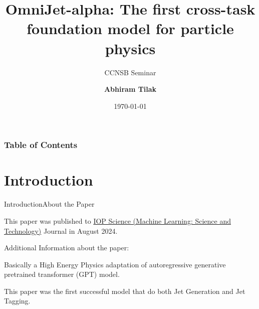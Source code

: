 \documentclass[10pt]{beamer}
\title[]{OmniJet-alpha: The first cross-task foundation model for particle physics}
\subtitle{CCNSB Seminar}
\author[Abhiram Tilak]
{\textbf{Abhiram Tilak}}
\institute[IIITH]
{
	\textit{\tiny{CND Dual Degree}} \\
	\textit{IIIT Hyderabad}
}
\date{\today}
\let\olditemize\itemize
\let\endolditemize\enditemize
\renewenvironment{itemize}{
  \olditemize[<+->] %
}{\endolditemize}
\begin{document}
\begin{frame}
	\titlepage
\end{frame}

\begin{frame}
\frametitle{Table of Contents}
\tableofcontents
\end{frame}

\section{Introduction}

\begin{frame}{Introduction}{About the Paper}

  This paper was published to \href{https://iopscience.iop.org/journal/2632-2153}{IOP Science (Machine Learning: Science and Technology)} Journal
  in August 2024.

  \vspace{2em}

  Additional Information about the paper:
  \begin{itemize}
    \item Basically a High Energy Physics adaptation of autoregressive generative pretrained transformer (GPT) model.
    \item This paper was the first successful model that do both Jet Generation and Jet Tagging.

  \end{itemize}
\end{frame}
\end{document}
